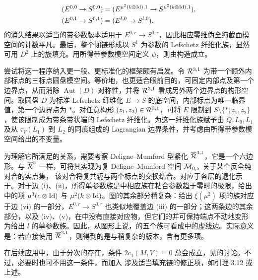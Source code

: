 \[
\begin{aligned}
(E^{0,0}\to S^{0,0})&=(E^{\mu^2(k\otimes\operatorname{Id}),1}\to S^{\mu^2(k\otimes\operatorname{Id}),1}),\\
(E^{0,1}\to S^{0,1})&=(E^{l,0}\to S^{l,0}).
\end{aligned}
\]
的消失结果以适当的带参数版本适用于 $E^{0,r}\to S^{0,r}$，因此相应零维伪全纯截面模空间的计数平凡。最后，整个闭链形成以 $S^1$ 为参数的 Lefschetz 纤维化族，显然可用 $D^2$ 上的族填充。用所得带参数模空间定义 $\psi$，则由构造成立。

\begin{note}\label{st:17.11}
尝试将这一程序纳入更一般、更标准化的框架颇有启发。令 $\mathcal R^{3,1}$ 为带一个额外内部标点的三标点圆盘模空间。等价地，也更适合眼前目的，可固定内部点及第一个边界点，从而消除 $\operatorname{Aut}(D)$ 对称性，并将 $\mathcal R^{3,1}$ 看成另外两个边界点的构形空间。取圆盘 $D$ 为标准 Lefschetz 纤维化 $E\to S$ 的底空间，内部标点为唯一临界值，第一个边界点为 $*$。对任意构形 $(z_1,z_2)\in\mathcal R^{3,1}$，可将 $E$ 限制到 $S\setminus\{*,z_1,z_2\}$，使该限制成为带条带状端的 Lefschetz 纤维化。为这一纤维化族赋予由 $Q,L_0,L_1$ 及从 $\tau_V(L_1)$ 到 $L_2$ 的同痕组成的 Lagrangian 边界条件，并考虑由所得带参数模空间给出的不变量。

为理解它所满足的关系，需要考察 Deligne–Mumford 型紧化 $\overline{\mathcal R}^{3,1}$，它是一个六边形。与 $\overline{\mathcal R}^5$ 一样，可将其实现为复 Deligne–Mumford 空间 $\overline{\mathcal M}_{0,5}$ 关于某个反全纯对合的实点集，
该对合将复共轭与两个标点的交换结合。对应于各层的退化示于。对于边 (i)、(ii)，所得单参数族是中相应族在粘合参数趋于零时的极限，给出中的项 $\mu^3(c\otimes\operatorname{Id})$ 与 $\mu^2(k\otimes\operatorname{Id})$。图的其余部分稍复杂：给出 $\xi(\mu^2)$ 项的族对应于边 (vi) 的一部分，$E^{0,r}\to S^{0,r}$ 也类似地覆盖边 (iii) 的一部分；这两条边的其余部分，以及 (iv)、(v)，在中没有直接对应物，但它们的并可保持端点不动地变形为给出 $l$ 的单参数族。因此，从图形上说，的五个族可看成中的虚线边。实际意义是：若直接使用 $\overline{\mathcal R}^{3,1}$，则得到的是与稍复杂的版本，含有更多项。
\end{note}

\begin{note}\label{st:17.12}
在后续应用中，由于分次的存在，条件 $2c_1(M,V)=0$ 总会成立，见的讨论。不过，必要时也可不用这一条件，而加入
涉及适当填充链的修正项，如引理 3.12 或上述。
\end{note}
